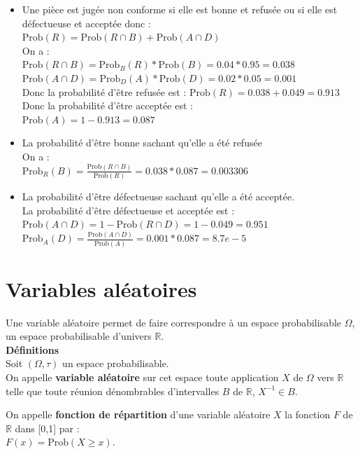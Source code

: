 \documentclass[a4paper,11pt]{book}
\newcommand{\R}{{\mathbb{R}}}
\begin{document}
\begin{itemize}
\item Une pi\`ece est jug\'ee non conforme si elle est bonne et refus\'ee ou 
si elle est d\'efectueuse et accept\'ee donc :\\
$\mbox{Prob}(R)=\mbox{Prob}(R\cap B)+\mbox{Prob}(A\cap D)$\\
On a :\\
$\mbox{Prob}(R\cap B)=\mbox{Prob}_B(R)*\mbox{Prob}(B)=0.04*0.95=0.038$\\
$\mbox{Prob}(A\cap D)=\mbox{Prob}_D(A)*\mbox{Prob}(D)=0.02*0.05=0.001$\\
Donc la probabilit\'e d'\^etre refus\'ee est :
$\mbox{Prob}(R)=0.038+0.049=0.913$\\
Donc la probabilit\'e d'\^etre accept\'ee est :\\
$\mbox{Prob}(A)=1-0.913=0.087$\\
\item La probabilit\'e d'\^etre bonne sachant qu'elle a \'et\'e refus\'ee\\
On a :\\
$\mbox{Prob}_R(B)=\frac{\mbox{Prob}(R\cap B)}{\mbox{Prob}(R)}=0.038*0.087=0.003306$
\item La probabilit\'e d'\^etre d\'efectueuse sachant qu'elle a \'et\'e 
accept\'ee.\\
La probabilit\'e d'\^etre d\'efectueuse et accept\'ee est :\\
$\mbox{Prob}(A\cap D)=1-\mbox{Prob}(R\cap D)=1-0.049=0.951$
$\mbox{Prob}_A(D)=\frac{\mbox{Prob}(A\cap D)}{\mbox{Prob}(A)}=0.001*0.087=8.7e-5$
\end{itemize}

\section{Variables al\'eatoires}
Une variable al\'eatoire permet de faire correspondre \`a un espace 
probabilisable $\Omega$, un espace probabilisable d'univers $\R$.\\
{\bf D\'efinitions}\\
Soit $(\Omega, \tau)$ un espace probabilisable.\\
On appelle {\bf variable al\'eatoire} sur cet espace toute application  $X$ de 
$\Omega$ vers $\R$ telle que toute 
r\'eunion d\'enombrables d'intervalles $B$ de $\R$, $X^{-1}\in B$.

On appelle {\bf fonction de r\'epartition} d'une variable al\'eatoire $X$ la 
fonction $F$ de $\R$ dans [0,1] par :\\
$F(x)=\mbox{Prob}(X\geq x)$.
\end{document}
